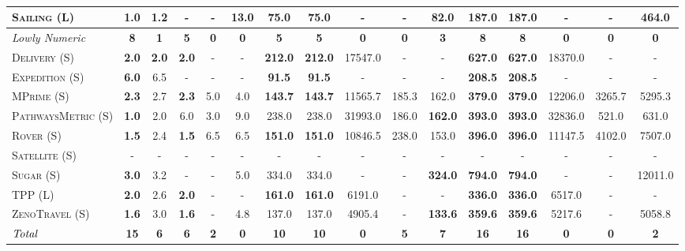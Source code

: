 \documentclass[11pt,landscape]{article}
\begin{document}
\begin{table}[tb]
{\begin{tabular}{|l||ccccc||ccccc||ccccc||}
\textsc{Sailing} (L)&\textbf{1.0}&1.2&-&-&13.0&\textbf{75.0}&\textbf{75.0}&-&-&82.0&\textbf{187.0}&\textbf{187.0}&-&-&464.0
\\\hline
\textit{Lowly Numeric}&\textbf{8}&\textbf{1}&\textbf{5}&\textbf{0}&\textbf{0}&\textbf{5}&\textbf{5}&\textbf{0}&\textbf{0}&\textbf{3}&\textbf{8}&\textbf{8}&\textbf{0}&\textbf{0}&\textbf{0}\\\hline
\textsc{Delivery} (S)&\textbf{2.0}&\textbf{2.0}&\textbf{2.0}&-&-&\textbf{212.0}&\textbf{212.0}&17547.0&-&-&\textbf{627.0}&\textbf{627.0}&18370.0&-&-\\
\textsc{Expedition} (S)&\textbf{6.0}&6.5&-&-&-&\textbf{91.5}&\textbf{91.5}&-&-&-&\textbf{208.5}&\textbf{208.5}&-&-&-\\
\textsc{MPrime} (S)&\textbf{2.3}&2.7&\textbf{2.3}&5.0&4.0&\textbf{143.7}&\textbf{143.7}&11565.7&185.3&162.0&\textbf{379.0}&\textbf{379.0}&12206.0&3265.7&5295.3\\
\textsc{PathwaysMetric} (S)&\textbf{1.0}&2.0&6.0&3.0&9.0&238.0&238.0&31993.0&186.0&\textbf{162.0}&\textbf{393.0}&\textbf{393.0}&32836.0&521.0&631.0\\
\textsc{Rover} (S)&\textbf{1.5}&2.4&\textbf{1.5}&6.5&6.5&\textbf{151.0}&\textbf{151.0}&10846.5&238.0&153.0&\textbf{396.0}&\textbf{396.0}&11147.5&4102.0&7507.0\\
\textsc{Satellite} (S)&-&-&-&-&-&-&-&-&-&-&-&-&-&-&-\\
\textsc{Sugar} (S)&\textbf{3.0}&3.2&-&-&5.0&334.0&334.0&-&-&\textbf{324.0}&\textbf{794.0}&\textbf{794.0}&-&-&12011.0\\
\textsc{TPP} (L)&\textbf{2.0}&2.6&\textbf{2.0}&-&-&\textbf{161.0}&\textbf{161.0}&6191.0&-&-&\textbf{336.0}&\textbf{336.0}&6517.0&-&-\\
\textsc{ZenoTravel} (S)&\textbf{1.6}&3.0&\textbf{1.6}&-&4.8&137.0&137.0&4905.4&-&\textbf{133.6}&\textbf{359.6}&\textbf{359.6}&5217.6&-&5058.8
\\\hline
$\emph{Total}$&\textbf{15}&\textbf{6}&\textbf{6}&\textbf{2}&\textbf{0}&\textbf{10}&\textbf{10}&\textbf{0}&\textbf{5}&\textbf{7}&\textbf{16}&\textbf{16}&\textbf{0}&\textbf{0}&\textbf{2}\\\hline

        \end{tabular}}
        \caption{}
        \label{tab:experiments-smt}
        \end{table}
        
\end{document}
